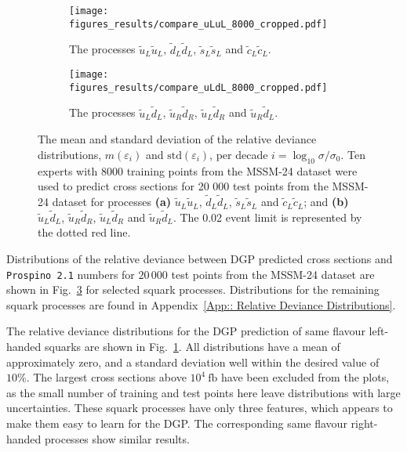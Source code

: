 \documentclass[twoside,english]{uiofysmaster}
\begin{document}
{{\begin{figure}
    \centering
    \begin{subfigure}[b]{0.9\textwidth}
        \texttt{[image: figures\_results/compare\_uLuL\_8000\_cropped.pdf]}
        \caption{The processes $\widetilde{u}_L \widetilde{u}_L$, $\widetilde{d}_L \widetilde{d}_L$, $\widetilde{s}_L \widetilde{s}_L$ and $\widetilde{c}_L \widetilde{c}_L$.}
        \label{Fig:: results : RD MSSM-24 uLuL}
    \end{subfigure}
    \begin{subfigure}[b]{0.9\textwidth}
        \texttt{[image: figures\_results/compare\_uLdL\_8000\_cropped.pdf]}
        \caption{The processes $\widetilde{u}_L\widetilde{d}_L$, $\widetilde{u}_R\widetilde{d}_R$, $\widetilde{u}_L\widetilde{d}_R$ and $\widetilde{u}_R\widetilde{d}_L$.}
        \label{Fig :: results : RD MSSM-24 uLdL}
    \end{subfigure}
    \caption{The mean and standard deviation of the relative deviance distributions, $m(\varepsilon_i)$ and $\mathrm{std}(\varepsilon_i)$, per decade $i =\log_{10} \sigma / \sigma_0$. Ten experts with 8000 training points from the MSSM-24 dataset were used to predict cross sections for 20 000 test points from the MSSM-24 dataset for processes \textbf{(a)}  $\widetilde{u}_L \widetilde{u}_L$, $\widetilde{d}_L \widetilde{d}_L$, $\widetilde{s}_L \widetilde{s}_L$ and $\widetilde{c}_L \widetilde{c}_L$; and \textbf{(b)} $\widetilde{u}_L\widetilde{d}_L$, $\widetilde{u}_R\widetilde{d}_R$, $\widetilde{u}_L\widetilde{d}_R$ and $\widetilde{u}_R\widetilde{d}_L$. The 0.02 event limit is represented by the dotted red line.}
\label{Fig:: results : RD MSSM-24}
\end{figure}

Distributions of the relative deviance between DGP predicted cross sections and \verb|Prospino 2.1| numbers for $20\,000$ test points from the MSSM-24 dataset are shown in Fig.~\ref{Fig:: results : RD MSSM-24} for selected squark processes. Distributions for the remaining squark processes are found in Appendix~\ref{App:: Relative Deviance Distributions}.

The relative deviance distributions for the DGP prediction of same flavour left-handed squarks are shown in Fig.~\ref{Fig:: results : RD MSSM-24 uLuL}. All distributions have a mean of approximately zero, and a standard deviation well within the desired value of $10 \%$. The largest cross sections above $10^4~\mathrm{fb}$ have been excluded from the plots, as the small number of training and test points here leave distributions with large uncertainties. These squark processes have only three features, which appears to make them easy to learn for the DGP. The corresponding same flavour right-handed processes show similar results.

}}
\end{document}
